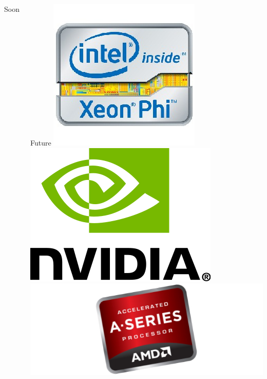 \documentclass[12pt]{beamer}
\begin{document}
\begin{frame}
\begin{columns}
\begin{block}{Soon}
  \end{block}
\pause
{}
  \begin{block}{Future}
  \centering
  \includegraphics[height=0.2\textheight]{img/phi} \\
  \includegraphics[height=0.2\textheight]{img/nvidia} \\
  \includegraphics[height=0.2\textheight]{img/apu}
  \end{block}
\end{columns}
\end{frame}
\end{document}
